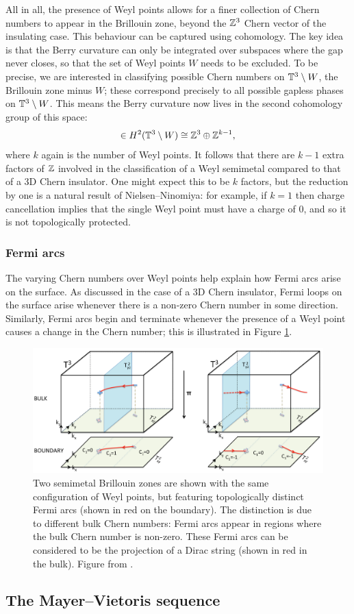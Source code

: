 All in all, the presence of Weyl points allows for a finer collection of Chern numbers to appear in the Brillouin zone, beyond the $\mathbb{Z}^3$ Chern vector of the insulating case. This behaviour can be captured using cohomology. The key idea is that the Berry curvature can only be integrated over subspaces where the gap never closes, so that the set of Weyl points $W$ needs to be excluded. To be precise, we are interested in classifying possible Chern numbers on $\mathbb{T}^3\setminus W$, the Brillouin zone minus $W$; these correspond precisely to all possible gapless phases on $\mathbb{T}^3\setminus W$. This means the Berry curvature now lives in the second cohomology group of this space:
\begin{equation}
	[\Fc]\in H^2(\T^3\setminus W) \cong \Z^3\oplus\Z^{k-1},
\end{equation}
where $k$ again is the number of Weyl points. It follows that there are $k-1$ extra factors of $\mathbb{Z}$ involved in the classification of a Weyl semimetal compared to that of a 3D Chern insulator. One might expect this to be $k$ factors, but the reduction by one is a natural result of Nielsen--Ninomiya: for example, if $k=1$ then charge cancellation implies that the single Weyl point must have a charge of 0, and so it is not topologically protected.


\subsubsection{Fermi arcs}

The varying Chern numbers over Weyl points help explain how Fermi arcs arise on the surface. As discussed in the case of a 3D Chern insulator, Fermi loops on the surface arise whenever there is a non-zero Chern number in some direction. Similarly, Fermi arcs begin and terminate whenever the presence of a Weyl point causes a change in the Chern number; this is illustrated in Figure \ref{fig:Fermi-arc-Chern}.
\begin{figure}[htb!]
	\centering
	\includegraphics[width=\linewidth]{Images/Fermi-arc-Chern}
	\caption{
		Two semimetal Brillouin zones are shown with the same configuration of Weyl points, but featuring topologically distinct Fermi arcs (shown in red on the boundary). The distinction is due to different bulk Chern numbers: Fermi arcs appear in regions where the bulk Chern number is non-zero. These Fermi arcs can be considered to be the projection of a Dirac string (shown in red in the bulk).
		Figure from \cite{Mathai_math-review}.}
	\label{fig:Fermi-arc-Chern}
\end{figure}

\subsection{The Mayer--Vietoris sequence}